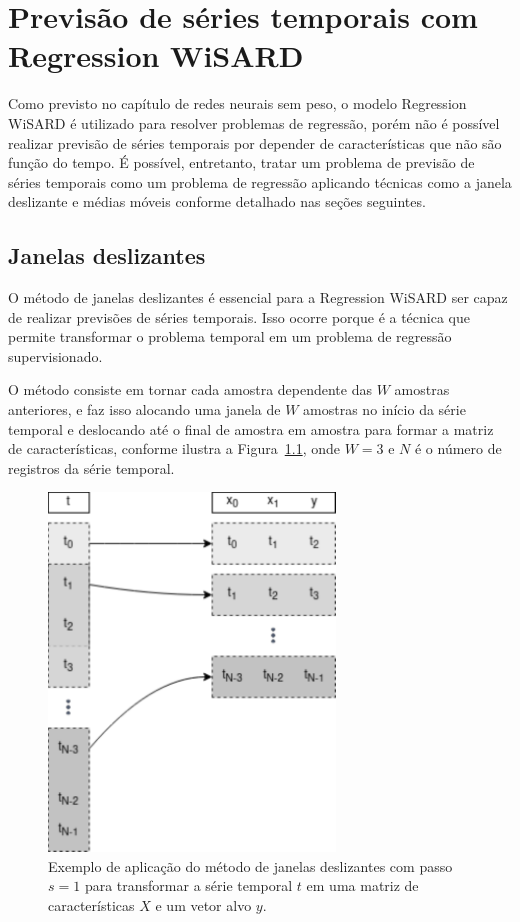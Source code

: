 \chapter{Previsão de séries temporais com Regression WiSARD}
\label{chap:04}

Como previsto no capítulo de redes neurais sem peso, o modelo Regression WiSARD é utilizado para resolver problemas de regressão, porém não é possível realizar previsão de séries temporais por depender de características que não são função do tempo. É possível, entretanto, tratar um problema de previsão de séries temporais como um problema de regressão aplicando técnicas como a janela deslizante e médias móveis conforme detalhado nas seções seguintes.

\section{Janelas deslizantes} \label{sec:sliding_window}
O método de janelas deslizantes é essencial para a Regression WiSARD ser capaz de realizar previsões de séries temporais. Isso ocorre porque é a técnica que permite transformar o problema temporal em um problema de regressão supervisionado.

O método consiste em tornar cada amostra dependente das $W$ amostras anteriores, e faz isso alocando uma janela de $W$ amostras no início da série temporal e deslocando até o final de amostra em amostra para formar a matriz de características, conforme ilustra a Figura~\ref{fig:sliding_window}, onde $W=3$ e $N$ é o número de registros da série temporal.

\begin{figure}[!htp]
    \centering
    \includegraphics[width=3.0in]{img/sliding_window.pdf}
    \caption{Exemplo de aplicação do método de janelas deslizantes com passo $s=1$  para transformar a série temporal $t$ em uma matriz de características $X$ e um vetor alvo $y$.}
    \label{fig:sliding_window}
\end{figure}


